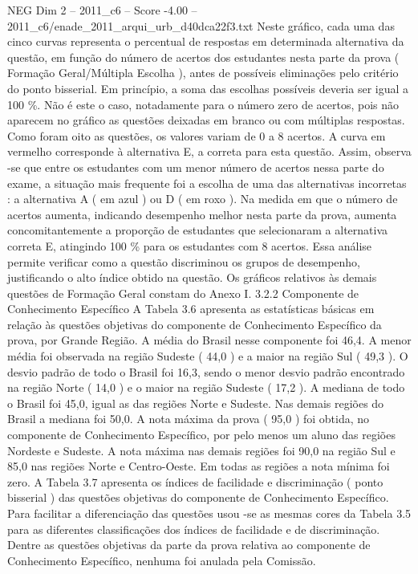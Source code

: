 \begin{textsample}{NEG Dim 2 – 2011\_c6 – Score -4.00 – 2011\_c6/enade\_2011\_arqui\_urb\_d40dca22f3.txt}
Neste gráfico, cada uma das cinco curvas representa o percentual de respostas em determinada alternativa da questão, em função do número de acertos dos estudantes nesta parte da prova ( Formação Geral/Múltipla Escolha ), antes de possíveis eliminações pelo critério do ponto bisserial.
Em princípio, a soma das escolhas possíveis deveria ser igual a 100 \%.
Não é este o caso, notadamente para o número zero de acertos, pois não aparecem no gráfico as questões deixadas em branco ou com múltiplas respostas.
Como foram oito as questões, os valores variam de 0 a 8 acertos.
A curva em vermelho corresponde à alternativa E, a correta para esta questão.
Assim, observa -se que entre os estudantes com um menor número de acertos nessa parte do exame, a situação mais frequente foi a escolha de uma das alternativas incorretas : a alternativa A ( em azul ) ou D ( em roxo ).
Na medida em que o número de acertos aumenta, indicando desempenho melhor nesta parte da prova, aumenta concomitantemente a proporção de estudantes que selecionaram a alternativa correta E, atingindo 100 \% para os estudantes com 8 acertos.
Essa análise permite verificar como a questão discriminou os grupos de desempenho, justificando o alto índice obtido na questão.
Os gráficos relativos às demais questões de Formação Geral constam do Anexo I. 3.2.2 Componente de Conhecimento Específico A Tabela 3.6 apresenta as estatísticas básicas em relação às questões objetivas do componente de Conhecimento Específico da prova, por Grande Região.
A média do Brasil nesse componente foi 46,4.
A menor média foi observada na região Sudeste ( 44,0 ) e a maior na região Sul ( 49,3 ).
O desvio padrão de todo o Brasil foi 16,3, sendo o menor desvio padrão encontrado na região Norte ( 14,0 ) e o maior na região Sudeste ( 17,2 ).
A mediana de todo o Brasil foi 45,0, igual as das regiões Norte e Sudeste.
Nas demais regiões do Brasil a mediana foi 50,0.
A nota máxima da prova ( 95,0 ) foi obtida, no componente de Conhecimento Específico, por pelo menos um aluno das regiões Nordeste e Sudeste.
A nota máxima nas demais regiões foi 90,0 na região Sul e 85,0 nas regiões Norte e Centro-Oeste.
Em todas as regiões a nota mínima foi zero.
A Tabela 3.7 apresenta os índices de facilidade e discriminação ( ponto bisserial ) das questões objetivas do componente de Conhecimento Específico.
Para facilitar a diferenciação das questões usou -se as mesmas cores da Tabela 3.5 para as diferentes classificações dos índices de facilidade e de discriminação.
Dentre as questões objetivas da parte da prova relativa ao componente de Conhecimento Específico, nenhuma foi anulada pela Comissão.

\end{textsample}
